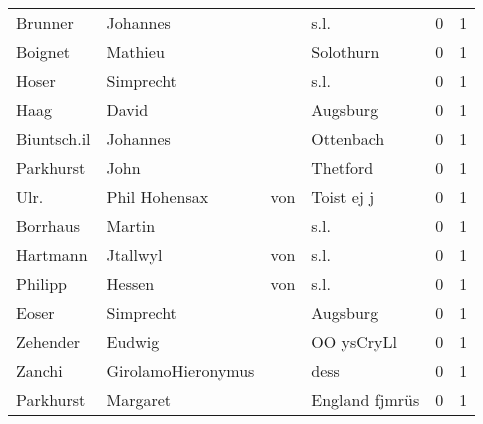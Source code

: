 \documentclass[10pt,a4paper,landscape]{article}
\begin{document}
\begin{longtable}{llllrr}
                  Brunner &                           Johannes &             &                                        s.l. &          0 &         1 \\
                  Boignet &                            Mathieu &             &                                   Solothurn &          0 &         1 \\
                    Hoser &                          Simprecht &             &                                        s.l. &          0 &         1 \\
                     Haag &                              David &             &                                    Augsburg &          0 &         1 \\
              Biuntsch.il &                           Johannes &             &                                   Ottenbach &          0 &         1 \\
                Parkhurst &                               John &             &                                    Thetford &          0 &         1 \\
                     Ulr. &                     Phil  Hohensax &         von &                                  Toist ej j &          0 &         1 \\
                 Borrhaus &                             Martin &             &                                        s.l. &          0 &         1 \\
                 Hartmann &                           Jtallwyl &         von &                                        s.l. &          0 &         1 \\
                  Philipp &                             Hessen &         von &                                        s.l. &          0 &         1 \\
                    Eoser &                          Simprecht &             &                                    Augsburg &          0 &         1 \\
                 Zehender &                             Eudwig &             &                                  OO ysCryLl &          0 &         1 \\
                   Zanchi &                 GirolamoHieronymus &             &                                        dess &          0 &         1 \\
                Parkhurst &                           Margaret &             &                              England fjmrüs &          0 &         1 \\

\end{longtable}
\end{document}
